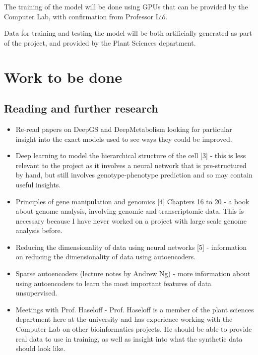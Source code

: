 \documentclass[12pt,a4paper,twoside,openany]{article}
\begin{document}
The training of the model will be done using GPUs that can be provided by the Computer Lab, with confirmation from Professor Li\'o.

Data for training and testing the model will be both artificially generated as part of the project, and provided by the Plant Sciences department.

\section*{Work to be done}

\subsection*{Reading and further research}

\begin{itemize}
    \item Re-read papers on DeepGS and DeepMetabolism looking for particular insight into the exact models used to see ways they could be improved.
    
    \item Deep learning to model the hierarchical structure of the cell [3] - this is less relevant to the project as it involves a neural network that is pre-structured by hand, but still involves genotype-phenotype prediction and so may contain useful insights.
    
    \item Principles of gene manipulation and genomics [4] Chapters 16 to 20 - a book about genome analysis, involving genomic and transcriptomic data. This is necessary because I have never worked on a project with large scale genome analysis before.
    
    \item Reducing the dimensionality of data using neural networks [5] - information on reducing the dimensionality of data using autoencoders.
    
    \item Sparse autoencoders (lecture notes by Andrew Ng) - more information about using autoencoders to learn the most important features of data unsupervised.
    
    \item Meetings with Prof. Haseloff - Prof. Haseloff is a member of the plant sciences department here at the university and has experience working with the Computer Lab on other bioinformatics projects. He should be able to provide real data to use in training, as well as insight into what the synthetic data should look like.
    
\end{itemize}
\end{document}
